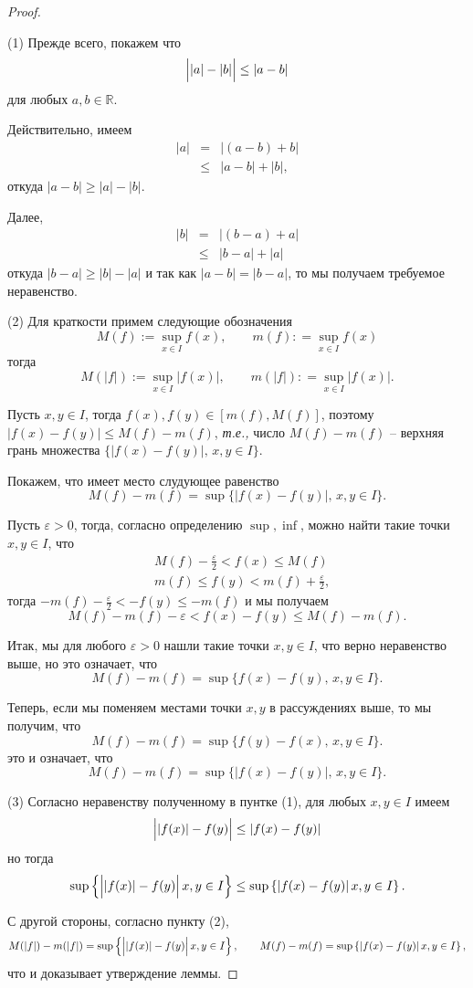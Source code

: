 \begin{proof}~

(1) Прежде всего, покажем что
\[
 \Bigl| |a| - |b| \Bigr| \le |a-b|
\]
для любых $a,b\in \mathbb{R}$.

Действительно, имеем
\begin{eqnarray*}
    |a| &=& |(a-b) + b|\\
    &\le & |a-b| + |b|,
\end{eqnarray*}
откуда $|a-b| \ge |a| - |b|.$

Далее,
\begin{eqnarray*}
    |b| &=& |(b-a) + a| \\
    &\le& |b-a| + |a|
\end{eqnarray*}
откуда $|b-a| \ge |b| - |a|$ и так как $|a-b| = |b-a|$, то мы получаем требуемое неравенство.

(2) Для краткости примем следующие обозначения
\[
 M(f):=\sup_{x \in I} f(x), \qquad m(f): = \sup_{x\in I}f(x)
\]
тогда
\[
M(|f|):=\sup_{x \in I} |f(x)|, \qquad m(|f|): = \sup_{x\in I}|f(x)|. 
\]

Пусть $x,y \in I$, тогда $f(x), f(y) \in [m(f), M(f)]$, поэтому $|f(x) - f(y)| \le M(f) - m(f)$, \textit{т.е.,} число $M(f) - m(f)$ -- верхняя грань множества $\{ |f(x) - f(y)|,\, x,y \in I  \}$.

Покажем, что имеет место слудующее равенство
\[
  M(f) - m(f) = \sup \{ | f(x) - f(y)|,\, x,y \in I \}.
\]

Пусть $\varepsilon>0$, тогда, согласно определению $\sup, \inf$, можно найти такие точки $x,y \in I$, что
\begin{align*}
    & M(f) - \frac{\varepsilon}{2} < f(x) \le M(f) \\
    & m(f) \le f(y) < m(f) + \frac{\varepsilon}{2},
\end{align*}
тогда $-m(f) - \frac{\varepsilon}{2} < -f(y) \le - m(f)$ и мы получаем
\[
 M(f) - m(f) - \varepsilon < f(x) - f(y) \le M(f) - m(f).
\]

Итак, мы для любого $\varepsilon>0$ нашли такие точки $x,y\in I$, что верно неравенство выше, но это означает, что 
\[
 M(f) - m(f) = \sup \{  f(x) - f(y),\, x,y \in I \}.
\]

Теперь, если мы поменяем местами точки $x,y$ в рассуждениях выше, то мы получим, что
\[
 M(f) - m(f) = \sup \{  f(y) - f(x),\, x,y \in I \}.
\]
это и означает, что
\[
  M(f) - m(f) = \sup \{ | f(x) - f(y)|,\, x,y \in I \}.
\]

(3) Согласно неравенству полученному в пунтке (1), для любых $x,y \in I$ имеем
\[
 \Bigl| |f(x)| - f(y)  \Bigr| \le |f(x) - f(y)|
\]
но тогда
\[
 \sup \left\{ \Bigl| |f(x)| - f(y)  \Bigr|\, x,y\in I  \right\} \le \sup \left\{ |f(x) - f(y)|\, x,y\in I \right\}.
\]

С другой стороны, согласно пункту (2),
\[
 M(|f|) - m(|f|) = \sup \left\{ \Bigl| |f(x)| - f(y)  \Bigr|\, x,y\in I  \right\}, \qquad M(f) - m(f) = \sup \left\{ |f(x) - f(y)|\, x,y\in I \right\},
\]
что и доказывает утверждение леммы.
\end{proof}

